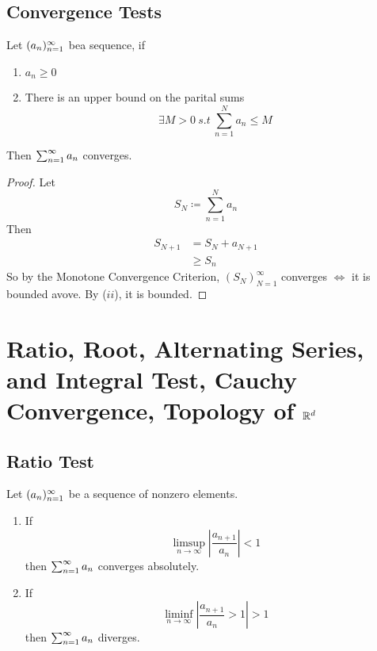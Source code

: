 \documentclass[openany]{report}
\begin{document}
\section{Convergence Tests}
\begin{prop}
    Let $({a}_n)_{n=1}^\infty$ bea  sequence, if 
    \begin{enumerate}[label=(\roman*)]
        \item $a_n \geq 0$
        \item There is an upper bound on the parital sums
        \[\exists M > 0 \ s.t \ \sum_{n=1}^N a_n \leq M\]
    \end{enumerate}
    Then $\sum_{n=1}^\infty a_n$ converges.
\end{prop}
\begin{proof}
    Let 
    \[S_N \coloneqq \sum_{n=1}^N a_n\]
    Then 
    \begin{align*}
        S_{N+1} &= S_N + a_{N+1}\\ 
        &\geq S_n
    \end{align*}
    So by the Monotone Convergence Criterion, $(S_N)_{N=1}^\infty$ converges $\iff$ it is bounded avove. By ($ii$), it is bounded.
\end{proof}

\begin{prop}
    
\end{prop}

\chapter{Ratio, Root, Alternating Series, and Integral Test, Cauchy Convergence, Topology of $\mathbb{R}^d$}
\section{Ratio Test}
\begin{prop}
    Let $({a}_n)_{n=1}^\infty$ be a sequence of nonzero elements.
    \begin{enumerate}[label=(\roman*)]
        \item If 
        \[\limsup_{n \rightarrow \infty} \left| \frac{a_{n+1}}{a_n} \right|< 1\]
        then $\sum_{n=1}^\infty a_n$ converges absolutely.
        \item If 
        \[\liminf_{n\rightarrow \infty} \left| \frac{a_{n+1}}{a_n} > 1 \right| > 1\]
        then $\sum_{n=1}^\infty a_n$ diverges.
    \end{enumerate}
\end{prop}
\end{document}
